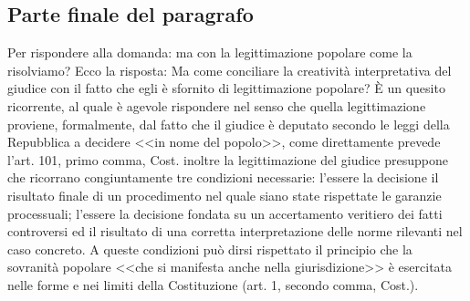 \subsection{Parte finale del paragrafo}
Per rispondere alla domanda: ma con la legittimazione popolare come la risolviamo? Ecco la risposta:
Ma come conciliare la creatività interpretativa del giudice con il fatto che egli
è sfornito di legittimazione popolare? È un quesito ricorrente, al quale è agevole
rispondere nel senso che quella legittimazione proviene, formalmente, dal fatto che il
giudice è deputato secondo le leggi della Repubblica a decidere <<in nome del popolo>>,
come direttamente prevede l'art. 101, primo comma, Cost. inoltre la legittimazione del giudice presuppone che ricorrano congiuntamente tre condizioni necessarie: l'essere la decisione il risultato finale di un procedimento nel quale siano state rispettate le garanzie processuali; l'essere
la decisione fondata su un accertamento veritiero dei fatti controversi ed il risultato
di una corretta interpretazione delle norme rilevanti nel caso concreto. A queste
condizioni può dirsi rispettato il principio che la sovranità popolare <<che si manifesta
anche nella giurisdizione>> è esercitata nelle forme e nei limiti della Costituzione (art.
1, secondo comma, Cost.).

